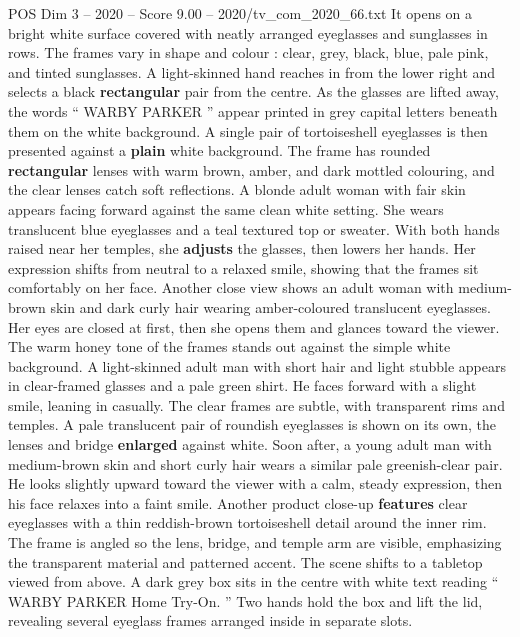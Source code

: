 \begin{textsample}{POS Dim 3 – 2020 – Score 9.00 – 2020/tv\_com\_2020\_66.txt}  \label{ex:f3_pos_071}
It opens on a bright white surface covered with neatly arranged eyeglasses and sunglasses in rows.
The frames vary in shape and colour : clear, grey, black, blue, pale pink, and tinted sunglasses.
A light-skinned hand reaches in from the lower right and selects a black \textbf{rectangular} pair from the centre.
As the glasses are lifted away, the words “ WARBY PARKER ” appear printed in grey capital letters beneath them on the white background.
A single pair of tortoiseshell eyeglasses is then presented against a \textbf{plain} white background.
The frame has rounded \textbf{rectangular} lenses with warm brown, amber, and dark mottled colouring, and the clear lenses catch soft reflections.
A blonde adult woman with fair skin appears facing forward against the same clean white setting.
She wears translucent blue eyeglasses and a teal textured top or sweater.
With both hands raised near her temples, she \textbf{adjusts} the glasses, then lowers her hands.
Her expression shifts from neutral to a relaxed smile, showing that the frames sit comfortably on her face.
Another close view shows an adult woman with medium-brown skin and dark curly hair wearing amber-coloured translucent eyeglasses.
Her eyes are closed at first, then she opens them and glances toward the viewer.
The warm honey tone of the frames stands out against the simple white background.
A light-skinned adult man with short hair and light stubble appears in clear-framed glasses and a pale green shirt.
He faces forward with a slight smile, leaning in casually.
The clear frames are subtle, with transparent rims and temples.
A pale translucent pair of roundish eyeglasses is shown on its own, the lenses and bridge \textbf{enlarged} against white.
Soon after, a young adult man with medium-brown skin and short curly hair wears a similar pale greenish-clear pair.
He looks slightly upward toward the viewer with a calm, steady expression, then his face relaxes into a faint smile.
Another product close-up \textbf{features} clear eyeglasses with a thin reddish-brown tortoiseshell detail around the inner rim.
The frame is angled so the lens, bridge, and temple arm are visible, emphasizing the transparent material and patterned accent.
The scene shifts to a tabletop viewed from above.
A dark grey box sits in the centre with white text reading “ WARBY PARKER Home Try-On. ” Two hands hold the box and lift the lid, revealing several eyeglass frames arranged inside in separate slots.

\end{textsample}
